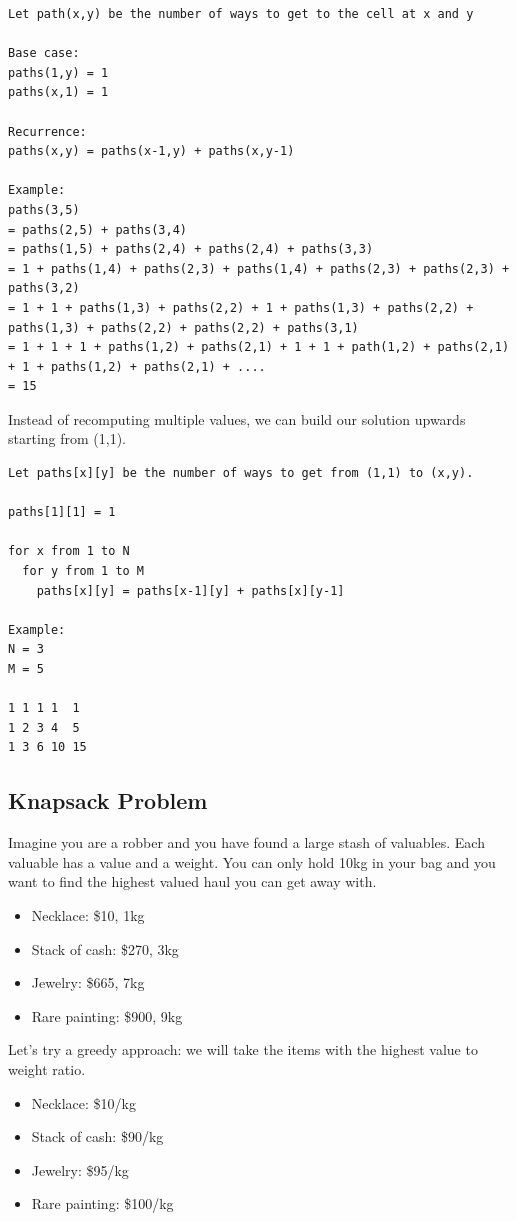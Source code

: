 \documentclass[11pt,oneside]{book}
\begin{document}
\begin{lstlisting}
Let path(x,y) be the number of ways to get to the cell at x and y

Base case:
paths(1,y) = 1
paths(x,1) = 1

Recurrence:
paths(x,y) = paths(x-1,y) + paths(x,y-1)

Example:
paths(3,5)
= paths(2,5) + paths(3,4)
= paths(1,5) + paths(2,4) + paths(2,4) + paths(3,3)
= 1 + paths(1,4) + paths(2,3) + paths(1,4) + paths(2,3) + paths(2,3) + paths(3,2)
= 1 + 1 + paths(1,3) + paths(2,2) + 1 + paths(1,3) + paths(2,2) + paths(1,3) + paths(2,2) + paths(2,2) + paths(3,1)
= 1 + 1 + 1 + paths(1,2) + paths(2,1) + 1 + 1 + path(1,2) + paths(2,1) + 1 + paths(1,2) + paths(2,1) + ....
= 15
\end{lstlisting}

Instead of recomputing multiple values, we can build our solution upwards starting from (1,1).

\begin{lstlisting}
Let paths[x][y] be the number of ways to get from (1,1) to (x,y). 

paths[1][1] = 1

for x from 1 to N
  for y from 1 to M
    paths[x][y] = paths[x-1][y] + paths[x][y-1]

Example:
N = 3
M = 5

1 1 1 1  1
1 2 3 4  5
1 3 6 10 15
\end{lstlisting}

\subsection{Knapsack Problem}

Imagine you are a robber and you have found a large stash of valuables. Each valuable has a value and a weight. You can only hold 10kg in your bag and you want to find the highest valued haul you can get away with.

\begin{itemize}
\item Necklace: \$10, 1kg
\item Stack of cash: \$270, 3kg
\item Jewelry: \$665, 7kg
\item Rare painting: \$900, 9kg
\end{itemize}

Let's try a greedy approach: we will take the items with the highest value to weight ratio.

\begin{itemize}
\item Necklace: \$10/kg
\item Stack of cash: \$90/kg
\item Jewelry: \$95/kg
\item Rare painting: \$100/kg
\end{itemize}
\end{document}

